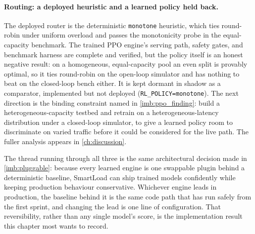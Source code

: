 \paragraph{Routing: a deployed heuristic and a learned policy held back.} The
deployed router is the deterministic \texttt{monotone} heuristic, which ties
round-robin under uniform overload and passes the monotonicity probe in the
equal-capacity benchmark. The trained PPO engine's serving path, safety gates, and
benchmark harness are complete and verified, but the policy itself is an honest
negative result: on a homogeneous, equal-capacity pool an even split is provably
optimal, so it ties round-robin on the open-loop simulator and has nothing to beat on
the closed-loop bench either. It is kept dormant in shadow as a comparator, implemented
but not deployed (\texttt{RL\_POLICY=monotone}). The next direction is the binding
constraint named in \cref{imb:ppo_finding}: build a heterogeneous-capacity testbed and
retrain on a heterogeneous-latency distribution under a closed-loop simulator, to give a
learned policy room to discriminate on varied traffic before it could be considered for
the live path. The fuller analysis
appears in \cref{ch:discussion}.

The thread running through all three is the same architectural decision made in
\cref{imb:pluggable}: because every learned engine is one swappable plugin behind a
deterministic baseline, SmartLoad can ship trained models confidently while keeping
production behaviour conservative. Whichever engine leads in production, the
baseline behind it is the same code path that has run safely from the first sprint,
and changing the lead is one line of configuration. That reversibility, rather than
any single model's score, is the implementation result this chapter most wants to
record.
